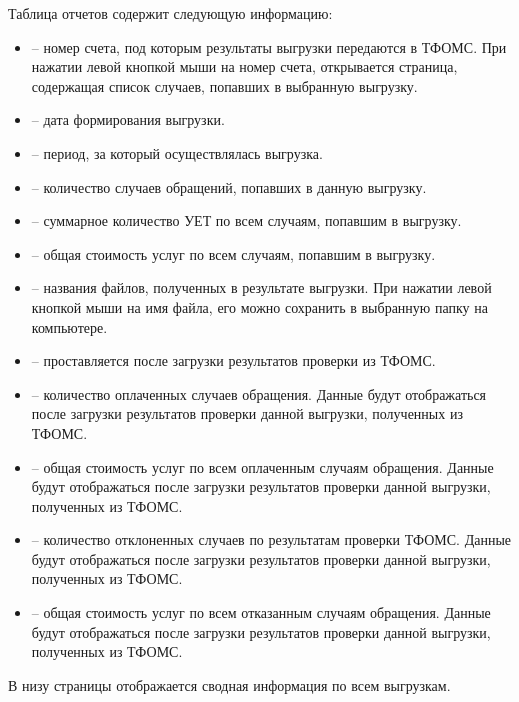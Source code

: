Таблица отчетов содержит следующую информацию:
\begin{itemize}
 \item {} – номер счета, под которым результаты выгрузки передаются в ТФОМС. При нажатии левой кнопкой мыши на номер счета, открывается страница, содержащая список случаев, попавших в выбранную выгрузку.
 \item {} – дата формирования выгрузки.
 \item {} – период, за который осуществлялась выгрузка.
 \item {} – количество случаев обращений, попавших в данную выгрузку.
 \item {} – суммарное количество УЕТ по всем случаям, попавшим в выгрузку.
 \item {} – общая стоимость услуг по всем случаям, попавшим в выгрузку.
 \item {} – названия файлов, полученных в результате выгрузки. При нажатии левой кнопкой мыши на имя файла, его можно сохранить в выбранную папку на компьютере.
 \item {} – проставляется после загрузки результатов проверки из ТФОМС.
 \item {} – количество оплаченных случаев обращения. Данные будут отображаться после загрузки результатов проверки данной выгрузки, полученных из ТФОМС.
 \item {} – общая стоимость услуг по всем оплаченным случаям обращения. Данные будут отображаться после загрузки результатов проверки данной выгрузки, полученных из ТФОМС.
 \item {} – количество отклоненных случаев по результатам проверки ТФОМС. Данные будут отображаться после загрузки результатов проверки данной выгрузки, полученных из ТФОМС.
 \item {} – общая стоимость услуг по всем отказанным случаям обращения. Данные будут отображаться после загрузки результатов проверки данной выгрузки, полученных из ТФОМС.
\end{itemize}
 
В низу страницы отображается сводная информация по всем выгрузкам.